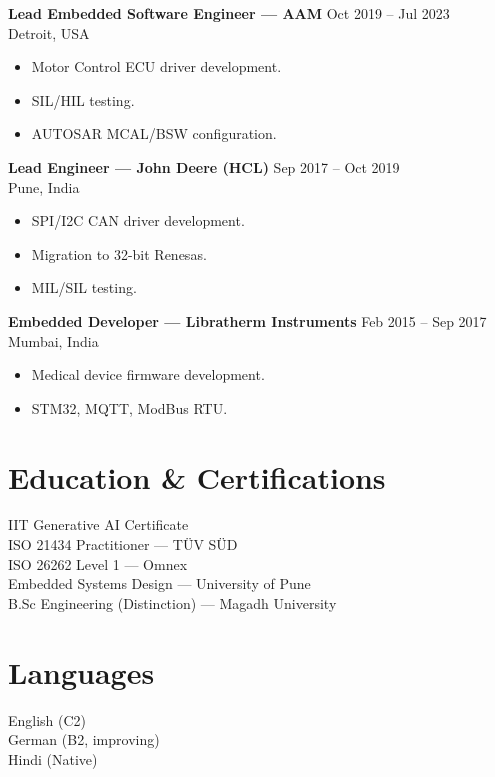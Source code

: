 \documentclass[a4paper,10pt]{article}
\begin{document}
\textbf{Lead Embedded Software Engineer — AAM} \hfill Oct 2019 -- Jul 2023 \\
Detroit, USA
\begin{itemize}
    \item Motor Control ECU driver development.
    \item SIL/HIL testing.
    \item AUTOSAR MCAL/BSW configuration.
\end{itemize}

\textbf{Lead Engineer — John Deere (HCL)} \hfill Sep 2017 -- Oct 2019 \\
Pune, India
\begin{itemize}
    \item SPI/I2C CAN driver development.
    \item Migration to 32-bit Renesas.
    \item MIL/SIL testing.
\end{itemize}

\textbf{Embedded Developer — Libratherm Instruments} \hfill Feb 2015 -- Sep 2017 \\
Mumbai, India
\begin{itemize}
    \item Medical device firmware development.
    \item STM32, MQTT, ModBus RTU.
\end{itemize}

\section*{Education & Certifications}
IIT Generative AI Certificate \\ISO 21434 Practitioner — TÜV SÜD \\ISO 26262 Level 1 — Omnex \\Embedded Systems Design — University of Pune \\B.Sc Engineering (Distinction) — Magadh University

\section*{Languages}
English (C2) \\German (B2, improving) \\Hindi (Native)
\end{document}

